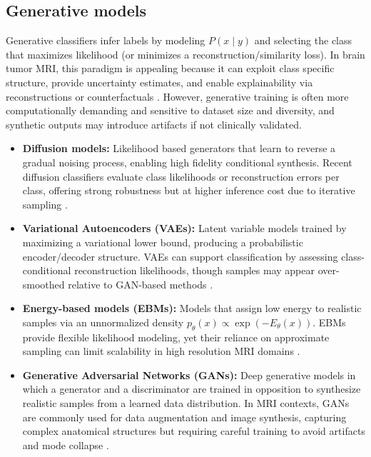 \subsection{Generative models}

Generative classifiers infer labels by modeling $P(x\mid y)$ and selecting the class that maximizes likelihood (or minimizes a reconstruction/similarity loss). In brain tumor MRI, this paradigm is appealing because it can exploit class specific structure, provide uncertainty estimates, and enable explainability via reconstructions or counterfactuals \citep{mackowiak2021generative}. However, generative training is often more computationally demanding and sensitive to dataset size and diversity, and synthetic outputs may introduce artifacts if not clinically validated. 


\begin{itemize}
    \item \textbf{Diffusion models:} Likelihood based generators that learn to reverse a gradual noising process, enabling high fidelity conditional synthesis. Recent diffusion classifiers evaluate class likelihoods or reconstruction errors per class, offering strong robustness but at higher inference cost due to iterative sampling \cite{ukita2025imageclassificationusingdiffusion}.


    \item \textbf{Variational Autoencoders (VAEs):} Latent variable models trained by maximizing a variational lower bound, producing a probabilistic encoder/decoder structure. VAEs can support classification by assessing class-conditional reconstruction likelihoods, though samples may appear over-smoothed relative to GAN-based methods \cite{Kingma_2019}.

    \item \textbf{Energy-based models (EBMs):} Models that assign low energy to realistic samples via an unnormalized density $p_\theta(x)\propto \exp(-E_\theta(x))$. EBMs provide flexible likelihood modeling, yet their reliance on approximate sampling can limit scalability in high resolution MRI domains \cite{du2020implicitgenerationgeneralizationenergybased}.

    \item \textbf{Generative Adversarial Networks (GANs):} Deep generative models in which a generator and a discriminator are trained in opposition to synthesize realistic samples from a learned data distribution. In MRI contexts, GANs are commonly used for data augmentation and image synthesis, capturing complex anatomical structures but requiring careful training to avoid artifacts and mode collapse \cite{goodfellow2014generativeadversarialnetworks}.

\end{itemize}


